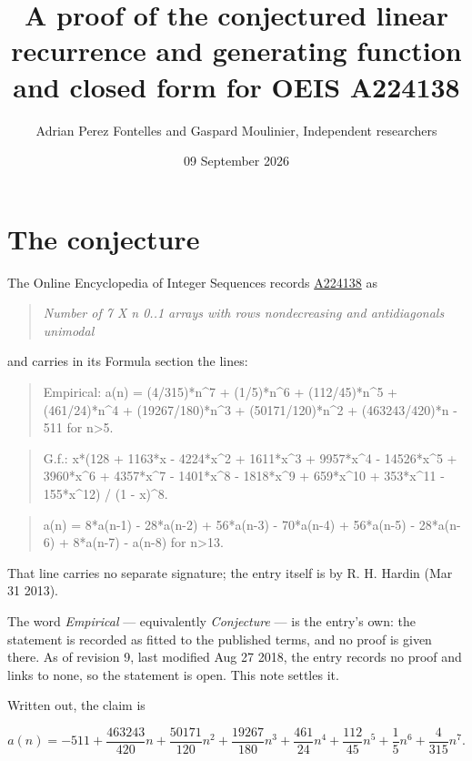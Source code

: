 \documentclass[11pt]{article}
\title{A proof of the conjectured linear recurrence and generating function and closed form for OEIS A224138}
\author{Adrian Perez Fontelles and Gaspard Moulinier, Independent researchers}
\date{09 September 2026}
\theoremstyle{definition}
\begin{document}
\maketitle
\section{The conjecture}

The Online Encyclopedia of Integer Sequences records \href{https://oeis.org/A224138}{A224138} as

\begin{quote}\itshape Number of 7 X n 0..1 arrays with rows nondecreasing and antidiagonals unimodal\end{quote}

and carries in its Formula section the lines:

\begin{quote}\ttfamily Empirical: a(n) = (4/315)*n\textasciicircum{}7 + (1/5)*n\textasciicircum{}6 + (112/45)*n\textasciicircum{}5 + (461/24)*n\textasciicircum{}4 + (19267/180)*n\textasciicircum{}3 + (50171/120)*n\textasciicircum{}2 + (463243/420)*n - 511 for n>5.\end{quote}

\begin{quote}\ttfamily G.f.: x*(128 + 1163*x - 4224*x\textasciicircum{}2 + 1611*x\textasciicircum{}3 + 9957*x\textasciicircum{}4 - 14526*x\textasciicircum{}5 + 3960*x\textasciicircum{}6 + 4357*x\textasciicircum{}7 - 1401*x\textasciicircum{}8 - 1818*x\textasciicircum{}9 + 659*x\textasciicircum{}10 + 353*x\textasciicircum{}11 - 155*x\textasciicircum{}12) / (1 - x)\textasciicircum{}8.\end{quote}

\begin{quote}\ttfamily a(n) = 8*a(n-1) - 28*a(n-2) + 56*a(n-3) - 70*a(n-4) + 56*a(n-5) - 28*a(n-6) + 8*a(n-7) - a(n-8) for n>13.\end{quote}

That line carries no separate signature; the entry itself is by R. H. Hardin (Mar 31 2013).

The word {\itshape Empirical} --- equivalently {\itshape Conjecture} --- is the entry's own: the statement is recorded as fitted to the published terms, and no proof is given there. As of revision 9, last modified Aug 27 2018, the entry records no proof and links to none, so the statement is open. This note settles it.

Written out, the claim is

\[a(n) = -511 + \frac{463243}{420}n + \frac{50171}{120}n^{2} + \frac{19267}{180}n^{3} + \frac{461}{24}n^{4} + \frac{112}{45}n^{5} + \frac{1}{5}n^{6} + \frac{4}{315}n^{7}.\]
\end{document}
